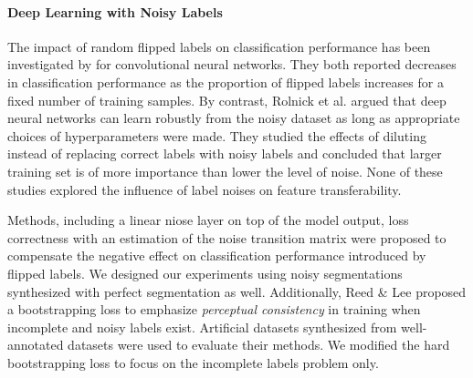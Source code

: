 
\paragraph{Deep Learning with Noisy Labels}

The impact of random flipped labels on classification performance has been investigated by \cite{sukhbaatar2014training,patrini2016making} for convolutional neural networks.
They both reported decreases in classification performance as the proportion of flipped labels increases for a fixed number of training samples.
By contrast, Rolnick et al.\cite{rolnick2017deep} argued that deep neural networks can learn robustly from the noisy dataset as long as appropriate choices of hyperparameters were made.
They studied the effects of diluting instead of replacing correct labels with noisy labels and concluded that larger training set is of more importance than lower the level of noise.
None of these studies explored the influence of label noises on feature transferability.

Methods, including a linear niose layer on top of the model output\cite{sukhbaatar2014training}, loss correctness with an estimation of the noise transition matrix\cite{patrini2016making} were proposed to compensate the negative effect on classification performance introduced by flipped labels.
We designed our experiments using noisy segmentations synthesized with perfect segmentation as well.
Additionally, Reed \& Lee\cite{reed2014training} proposed a bootstrapping loss to emphasize \textit{perceptual consistency} in training when incomplete and noisy labels exist.
Artificial datasets synthesized from well-annotated datasets were used to evaluate their methods.
We modified the hard bootstrapping loss to focus on the incomplete labels problem only.


